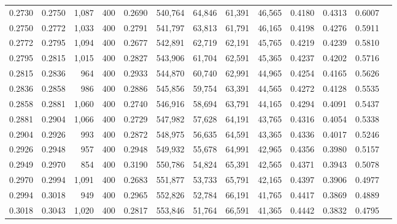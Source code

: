 \begin{tabular}{rrrrrrrrrrrrr}
0.2730 & 0.2750 &  1,087 &   400 &                                     0.2690 & 540,764 &  64,846 &  61,391 &  46,565 & 0.4180 & 0.4313 & 0.6007 \\
0.2750 & 0.2772 &  1,033 &   400 &                                     0.2791 & 541,797 &  63,813 &  61,791 &  46,165 & 0.4198 & 0.4276 & 0.5911 \\
0.2772 & 0.2795 &  1,094 &   400 &                                     0.2677 & 542,891 &  62,719 &  62,191 &  45,765 & 0.4219 & 0.4239 & 0.5810 \\
0.2795 & 0.2815 &  1,015 &   400 &                                     0.2827 & 543,906 &  61,704 &  62,591 &  45,365 & 0.4237 & 0.4202 & 0.5716 \\
0.2815 & 0.2836 &    964 &   400 &                                     0.2933 & 544,870 &  60,740 &  62,991 &  44,965 & 0.4254 & 0.4165 & 0.5626 \\
0.2836 & 0.2858 &    986 &   400 &                                     0.2886 & 545,856 &  59,754 &  63,391 &  44,565 & 0.4272 & 0.4128 & 0.5535 \\
0.2858 & 0.2881 &  1,060 &   400 &                                     0.2740 & 546,916 &  58,694 &  63,791 &  44,165 & 0.4294 & 0.4091 & 0.5437 \\
0.2881 & 0.2904 &  1,066 &   400 &                                     0.2729 & 547,982 &  57,628 &  64,191 &  43,765 & 0.4316 & 0.4054 & 0.5338 \\
0.2904 & 0.2926 &    993 &   400 &                                     0.2872 & 548,975 &  56,635 &  64,591 &  43,365 & 0.4336 & 0.4017 & 0.5246 \\
0.2926 & 0.2948 &    957 &   400 &                                     0.2948 & 549,932 &  55,678 &  64,991 &  42,965 & 0.4356 & 0.3980 & 0.5157 \\
0.2949 & 0.2970 &    854 &   400 &                                     0.3190 & 550,786 &  54,824 &  65,391 &  42,565 & 0.4371 & 0.3943 & 0.5078 \\
0.2970 & 0.2994 &  1,091 &   400 &                                     0.2683 & 551,877 &  53,733 &  65,791 &  42,165 & 0.4397 & 0.3906 & 0.4977 \\
0.2994 & 0.3018 &    949 &   400 &                                     0.2965 & 552,826 &  52,784 &  66,191 &  41,765 & 0.4417 & 0.3869 & 0.4889 \\
0.3018 & 0.3043 &  1,020 &   400 &                                     0.2817 & 553,846 &  51,764 &  66,591 &  41,365 & 0.4442 & 0.3832 & 0.4795 \\

\end{tabular}
